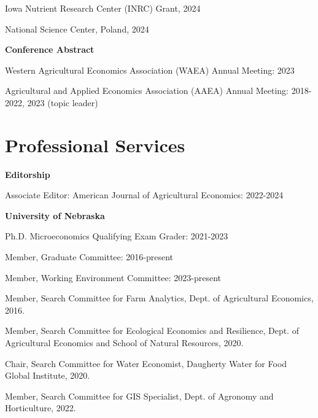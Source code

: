 \documentclass[10pt,margin,line]{res}
\newenvironment{list1}{
  \begin{list}{\ding{113}}{%
      \setlength{\itemsep}{0in}
      \setlength{\parsep}{0in} \setlength{\parskip}{0in}
      \setlength{\topsep}{0in} \setlength{\partopsep}{0in}
      \setlength{\leftmargin}{0.17in}}}{\end{list}}
\newenvironment{list2}{
  \begin{list}{-}{%
      \setlength{\itemsep}{0in}
      \setlength{\parsep}{0in} \setlength{\parskip}{0in}
      \setlength{\topsep}{0in} \setlength{\partopsep}{0in}
      \setlength{\leftmargin}{0.2in}}}{\end{list}}
\begin{document}
\begin{resume}
\begin{list1}
\begin{list2}
  \item Iowa Nutrient Research Center (INRC) Grant, 2024  
  \item National Science Center, Poland, 2024  
  \end{list2}
\item[] \textbf{Conference Abstract}
  \begin{list2}
  \item Western Agricultural Economics Association (WAEA) Annual Meeting: 2023 
  \item Agricultural and Applied Economics Association (AAEA) Annual Meeting: 2018-2022, 2023 (topic leader)
  \end{list2}
\end{list1}

\section{\sc Professional Services}
\begin{list1}
  \item[] \textbf{Editorship}
    \begin{list2}
    \item Associate Editor: American Journal of Agricultural Economics: 2022-2024
    \end{list2}
  \item[] \textbf{University of Nebraska}
    \begin{list2}
    \item Ph.D. Microeconomics Qualifying Exam Grader: 2021-2023
    \item Member, Graduate Committee: 2016-present
    \item Member, Working Environment Committee: 2023-present
    \item Member, Search Committee for Farm Analytics, Dept. of Agricultural Economics, 2016.
    \item Member, Search Committee for Ecological Economics and Resilience, Dept. of Agricultural Economics and School of Natural Resources, 2020.
    \item Chair, Search Committee for Water Economist, Daugherty Water for Food Global Institute, 2020.
    \item Member, Search Committee for GIS Specialist, Dept. of Agronomy and Horticulture, 2022.
    \end{list2}
\end{list1}


\end{resume}
\end{document}
